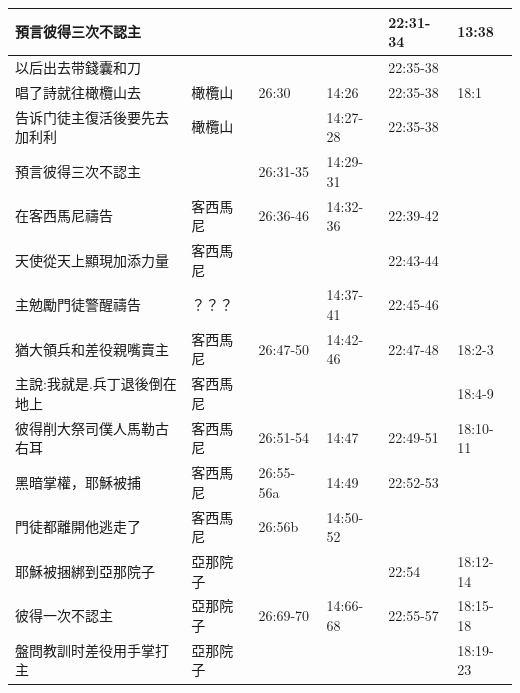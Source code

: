 \begin{table}[H]
\begin{tabular}{p{14em}|p{7.93em}|l|l|l|p{4.855em}}
預言彼得三次不認主&&       &       &22:31-34&13:38\\\midrule
以后出去带錢囊和刀&       &       &       &22:35-38&  \\\midrule

唱了詩就往橄欖山去&橄欖山  &26:30 &14:26 &22:35-38&18:1 \\\midrule

告诉门徒主復活後要先去加利利&橄欖山  & &14:27-28 &22:35-38&  \\\midrule
預言彼得三次不認主&&26:31-35&  14:29-31 &      &  \\\midrule

在客西馬尼禱告&客西馬尼&26:36-46& 14:32-36 &22:39-42&  \\\midrule
天使從天上顯現加添力量&客西馬尼&       &       &22:43-44&  \\\midrule
主勉勵門徒警醒禱告&？？？ &       &14:37-41&22:45-46&  \\\midrule
猶大領兵和差役親嘴賣主&客西馬尼&26:47-50&14:42-46&22:47-48&18:2-3  \\\midrule
主說:我就是.兵丁退後倒在地上&客西馬尼&       &       &&18:4-9\\\midrule
彼得削大祭司僕人馬勒古右耳&客西馬尼&26:51-54&14:47 &22:49-51&18:10-11 \\\midrule

黑暗掌權，耶穌被捕&客西馬尼&26:55-56a&14:49&22:52-53&  \\\midrule
門徒都離開他逃走了&客西馬尼  & 26:56b &14:50-52&  \\\midrule

耶穌被捆綁到亞那院子&亞那院子&       &       &22:54&18:12-14\\\midrule
彼得一次不認主&亞那院子&26:69-70&14:66-68&22:55-57&18:15-18\\\midrule
盤問教訓时差役用手掌打主&亞那院子&&&&18:19-23\\\midrule
\end{tabular}%
\end{table}


